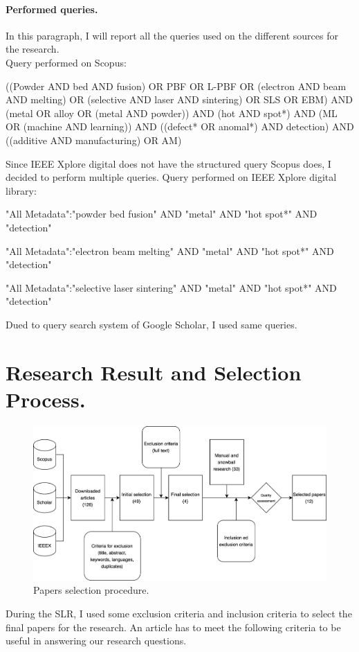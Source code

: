 \paragraph{Performed queries.} In this paragraph, I will report all the queries used on the different sources for the research. \\[1.5ex]
Query performed on Scopus:
\begin{tcolorbox}
\footnotesize
((Powder AND bed AND fusion) OR PBF OR L-PBF OR (electron AND beam AND melting) OR (selective AND laser AND sintering) OR SLS OR EBM) AND (metal OR alloy OR (metal AND powder)) AND  (hot AND spot*) AND (ML OR (machine AND learning)) AND ((defect* OR anomal*) AND detection) AND ((additive AND manufacturing) OR AM)
\end{tcolorbox}
Since IEEE Xplore digital does not have the structured query Scopus does, I decided to perform multiple queries. Query performed on IEEE Xplore digital library:
\begin{tcolorbox}
\footnotesize
"All Metadata":"powder bed fusion" AND "metal" AND "hot spot*" AND "detection"
\end{tcolorbox}
\begin{tcolorbox}
\footnotesize
"All Metadata":"electron beam melting" AND "metal" AND "hot spot*" AND "detection"
\end{tcolorbox}
\begin{tcolorbox}
\footnotesize
"All Metadata":"selective laser sintering" AND "metal" AND "hot spot*" AND "detection"
\end{tcolorbox}
Dued to query search system of Google Scholar, I used same queries.



\section{Research Result and Selection Process.}
\label{sec:resresults}
\begin{figure}
    \centering
    \includegraphics[scale=0.1]{Images/selezioncina.png}
    \caption[Papers selection procedure.] {Papers selection procedure.}
    \label{fig:selezioncina}
\end{figure}
During the SLR, I used some exclusion criteria and inclusion criteria to select the final papers for the research. An article has to meet the following criteria to be useful in answering our research questions.
